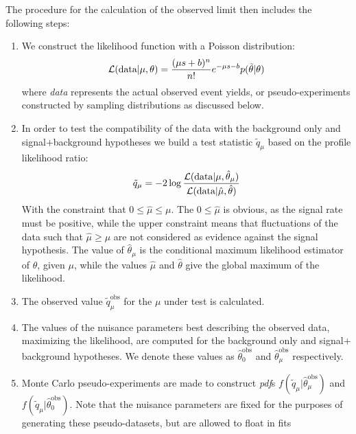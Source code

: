 The procedure for the calculation of the observed limit then includes the
following steps:
\begin{enumerate}
    \item We construct the likelihood function with a Poisson
        distribution:
        \begin{equation*}
            \mathcal{L}(\text{data} | \mu, \theta) = \dfrac{(\mu s +
            b)^n}{n!}e^{-\mu s - b} p(\tilde \theta | \theta)
        \end{equation*}
        where \emph{data} represents the actual observed event yields, or
        pseudo-experiments constructed by sampling distributions as
        discussed below.
    \item In order to test the compatibility of the data with the background
        only and signal$+$background hypotheses we build a test statistic
        $\tilde{q}_\mu$  based on the profile likelihood ratio:
        \begin{equation*}
            \tilde{q}_\mu = -2 \log \dfrac{\mathcal{L}(\text{data}|\mu,
            \hat{\theta}_\mu)}{\mathcal{L}(\text{data}|\hat{\mu},
            \hat{\theta})}
        \end{equation*}
        With the constraint that $0 \leq \hat\mu \leq \mu$. The $0 \leq
        \hat\mu$ is obvious, as the signal rate must be positive, while the
        upper constraint means that fluctuations of the data such that
        $\hat\mu \geq \mu$ are not considered as evidence against the signal
        hypothesis.
        The value of $\hat{\theta}_\mu$ is the conditional maximum
        likelihood estimator of $\theta$, given $\mu$, while the values
        $\hat\mu$ and $\hat\theta$ give the global maximum of the
        likelihood.
    \item The observed value $\tilde{q}_\mu^{\text{obs}}$ for the $\mu$
        under test is calculated.
    \item The values of the nuisance parameters best describing the observed
        data, \ie maximizing the likelihood, are computed for the background
        only and signal$+$background hypotheses. We denote these values as
        $\hat{\theta}_0^{\text{obs}}$ and
        $\hat{\theta}_{\mu}^{\text{obs}}$ respectively.
    \item Monte Carlo pseudo-experiments are made to construct
        \emph{pdf}s $f(\tilde{q}_\mu|\hat{\theta}_{\mu}^{\text{obs}})$ and
        $f(\tilde{q}_\mu|\hat{\theta}_{0}^{\text{obs}})$.
        Note that the nuisance parameters are fixed for the purposes of
        generating these pseudo-datasets, but are allowed to float in fits

\end{enumerate}
